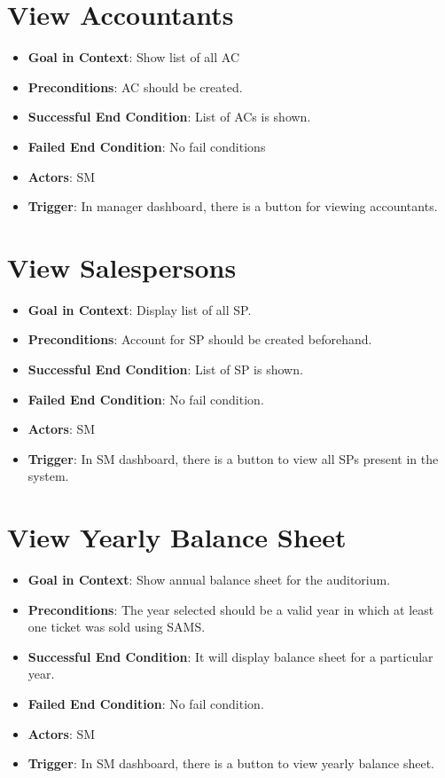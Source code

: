 \documentclass{scrreprt}
\begin{document}
\section{View Accountants}
\begin{itemize}
\item \textbf{Goal in Context}: Show list of all AC
\item \textbf{Preconditions}: AC should be created.
\item \textbf{Successful End Condition}: List of ACs is shown.
\item \textbf{Failed End Condition}: No fail conditions
\item \textbf{Actors}: SM
\item \textbf{Trigger}: In manager dashboard, there is a button for viewing accountants.
\end{itemize}

\section{View Salespersons}
\begin{itemize}
\item \textbf{Goal in Context}: Display list of all SP.
\item \textbf{Preconditions}: Account for SP should be created beforehand.
\item \textbf{Successful End Condition}:  List of SP is shown.
\item \textbf{Failed End Condition}: No fail condition.
\item \textbf{Actors}: SM
\item \textbf{Trigger}: In SM dashboard, there is a button to view all SPs present in the system.
\end{itemize}


\section{View Yearly Balance Sheet}
\begin{itemize}
\item \textbf{Goal in Context}: Show annual balance sheet for the auditorium.
\item \textbf{Preconditions}: The year selected should be a valid year in which at least one ticket was sold using SAMS.  
\item \textbf{Successful End Condition}: It will display balance sheet for a particular year.
\item \textbf{Failed End Condition}: No fail condition.
\item \textbf{Actors}: SM
\item \textbf{Trigger}: In SM dashboard, there is a button to view  yearly balance sheet. 
\end{itemize}
\end{document}
